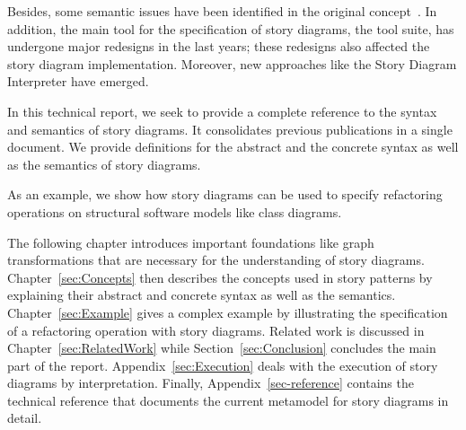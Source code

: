 Besides, some semantic issues have been identified in the original concept~\cite{TMG06}.
In addition, the main tool for the specification of story diagrams, the \fuj tool suite, has undergone major redesigns in the last years; these redesigns also affected the story diagram implementation.
Moreover, new approaches like the Story Diagram Interpreter have emerged.

In this technical report, we seek to provide a complete reference to the syntax and semantics of story diagrams.
It consolidates previous publications in a single document.
We provide definitions for the abstract and the concrete syntax as well as the semantics of story diagrams.

As an example, we show how story diagrams can be used to specify refactoring operations on structural software models like class diagrams.


The following chapter introduces important foundations like graph transformations that are necessary for the understanding of story diagrams.
Chapter~\ref{sec:Concepts} then describes the concepts used in story patterns by explaining their abstract and concrete syntax as well as the semantics.
Chapter~\ref{sec:Example} gives a complex example by illustrating the specification of a refactoring operation with story diagrams.
Related work is discussed in Chapter~\ref{sec:RelatedWork} while Section~\ref{sec:Conclusion} concludes the main part of the report.
Appendix~\ref{sec:Execution} deals with the execution of story diagrams by interpretation.
Finally, Appendix~\ref{sec-reference} contains the technical reference that documents the current metamodel for story diagrams in detail.